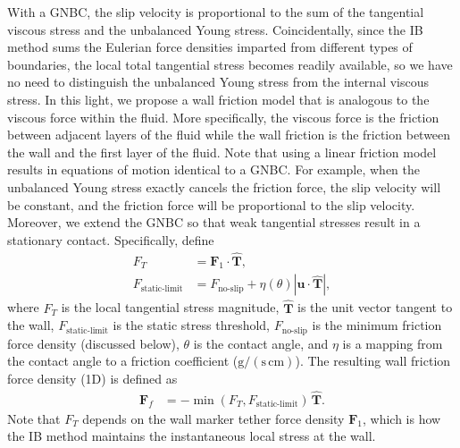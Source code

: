 \documentclass[%
 aip,
 amsmath,amssymb,
 reprint,
 floatfix
]{revtex4-1}
\begin{document}
With a GNBC, the slip velocity is proportional to the sum of the tangential viscous stress and the unbalanced Young stress. Coincidentally, since the IB method sums the Eulerian force densities imparted from different types of boundaries, the local total tangential stress becomes readily available, so we have no need to distinguish the unbalanced Young stress from the internal viscous stress. In this light, we propose a wall friction model that is analogous to the viscous force within the fluid. More specifically, the viscous force is the friction between adjacent layers of the fluid while the wall friction is the friction between the wall and the first layer of the fluid. Note that using a linear friction model results in equations of motion identical to a GNBC. For example, when the unbalanced Young stress exactly cancels the friction force, the slip velocity will be constant, and the friction force will be proportional to the slip velocity. Moreover, we extend the GNBC so that weak tangential stresses result in a stationary contact. Specifically, define
\begin{align}
F_T & = \bm{F}_1 \cdot \bm{\hat{T}} , \\
F_\text{static-limit} & =
F_\text{no-slip} + \eta(\theta)
\left|
    \bm{u} \cdot \bm{\hat{T}}
\right|,
\label{eq:friction1}
\end{align}
where $F_T$ is the local tangential stress magnitude, $\bm{\hat{T}}$ is the unit vector tangent to the wall, $F_\text{static-limit}$ is the static stress threshold, $F_\text{no-slip}$ is the minimum friction force density (discussed below), $\theta$ is the contact angle, and $\eta$ is a mapping from the contact angle to a friction coefficient ($\text{g}/(\text{s} \, \text{cm})$). The resulting wall friction force density (1D) is defined as
\begin{align}
\bm{F}_f & = -\min ( F_T, F_\text{static-limit} )\,
\bm{\hat{T}}.
\label{eq:friction2}
\end{align}
Note that $F_T$ depends on the wall marker tether force density $\bm{F}_1$, which is how the IB method maintains the instantaneous local stress at the wall. 
\end{document}
